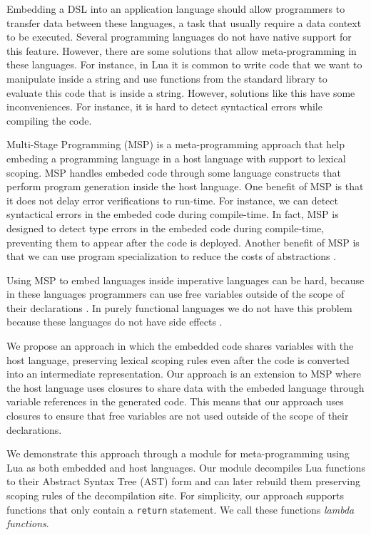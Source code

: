 \documentclass[english]{llncs}
\begin{document}
Embedding a DSL into an application language should allow programmers
to transfer data between these languages, a task that usually require
a data context to be executed.
Several programming languages do not have native support for this feature.
However, there are some solutions that allow meta-programming in these languages.
For instance, in Lua it is common to write code that we want to manipulate
inside a string and use functions from the standard library to evaluate this
code that is inside a string.
However, solutions like this have some inconveniences.
For instance, it is hard to detect syntactical errors while compiling the code.

Multi-Stage Programming (MSP) \cite{Taha1999MSP,Taha2004gentle,Taha2008gentle}
is a meta-programming approach that help embeding a programming language in
a host language with support to lexical scoping.
MSP handles embeded code through some language constructs that perform
program generation inside the host language.
One benefit of MSP is that it does not delay error verifications to run-time.
For instance, we can detect syntactical errors in the embeded code
during compile-time.
In fact, MSP is designed to detect type errors in the embeded code
during compile-time, preventing them to appear after the code is deployed.
Another benefit of MSP is that we can use program specialization to
reduce the costs of abstractions \cite{Taha1999MSP}.

Using MSP to embed languages inside imperative languages can be hard,
because in these languages programmers can use free variables outside
of the scope of their declarations \cite{Westbrook2010Mint}.
In purely functional languages we do not have this problem because these
languages do not have side effects \cite{Kameyama2008CSS}.

We propose an approach in which the embedded code shares variables with the
host language, preserving lexical scoping rules even after the code is
converted into an intermediate representation.
Our approach is an extension to MSP where the host language uses closures
to share data with the embeded language through variable references in
the generated code.
This means that our approach uses closures to ensure that free variables
are not used outside of the scope of their declarations.

We demonstrate this approach through a module for meta-programming using Lua
as both embedded and host languages.
Our module decompiles Lua functions to their Abstract Syntax Tree (AST) form
and can later rebuild them preserving scoping rules of the decompilation site.
For simplicity, our approach supports functions that only contain a
\texttt{return} statement.
We call these functions \emph{lambda functions}.
\end{document}

